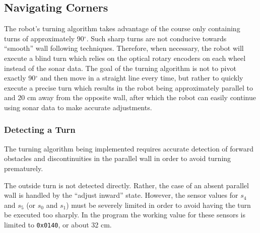 \subsection{Navigating Corners}

The robot's turning algorithm takes advantage of the course only
containing turns of approximately 90\(^\circ\). Such sharp turns
are not conducive towards ``smooth'' wall following techniques.
Therefore, when necessary, the robot will execute a blind turn which relies on the
optical rotary encoders on each wheel instead of the sonar data.
The goal of the turning algorithm is not to pivot exactly 90\(^\circ\)
and then move in a straight line every time, but rather to quickly
execute a precise turn which results
in the robot being approximately parallel to and 20 cm away from the
opposite wall, after which the robot can easily continue using sonar
data to make accurate adjustments.

\subsubsection{Detecting a Turn}
The turning algorithm being implemented requires accurate detection of
forward obstacles and discontinuities in the parallel wall in order to
avoid turning prematurely.

The outside turn is not detected directly. Rather, the case of an
absent parallel wall is handled by the ``adjust inward''
state. However, the sensor values for \(s_4\) and \(s_5\) (or \(s_0\)
and \(s_1\)) must be severely limited in order to avoid having the turn 
be executed too sharply. In the program the working value for these
sensors is limited to \verb+0x0140+, or about 32 cm.

\begin{figure}[h!]
  \centering \cprotect {}
\end{figure}

